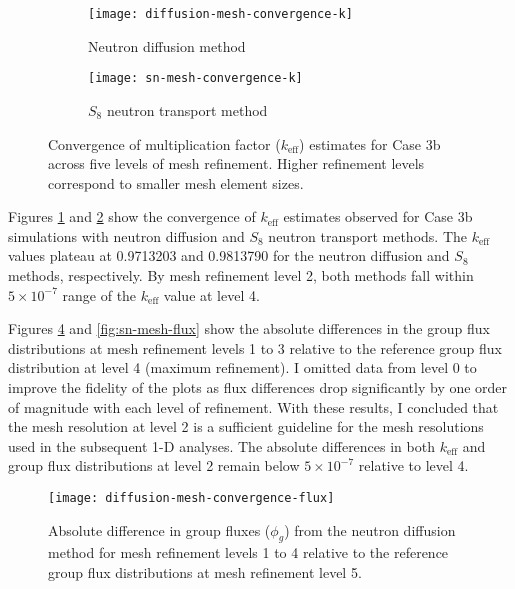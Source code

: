 \begin{figure}[htb!]
  \centering
  \begin{subfigure}[b]{0.48\columnwidth}
    \centering
    \texttt{[image: diffusion-mesh-convergence-k]}
    \caption{Neutron diffusion method}
    \label{fig:diff-mesh-k}
  \end{subfigure}
  \hfill
  \begin{subfigure}[b]{0.48\columnwidth}
    \centering
    \texttt{[image: sn-mesh-convergence-k]}
    \caption{$S_8$ neutron transport method}
    \label{fig:sn-mesh-k}
  \end{subfigure}
  \caption{Convergence of multiplication factor ($k_\text{eff}$) estimates for Case 3b across five
    levels of mesh refinement. Higher refinement levels correspond to smaller mesh element sizes.}
  \label{fig:mesh-k}
\end{figure}

Figures \ref{fig:diff-mesh-k} and \ref{fig:sn-mesh-k} show the convergence of $k_\text{eff}$
estimates observed for Case 3b simulations with neutron diffusion and $S_8$ neutron transport
methods. The $k_\text{eff}$ values plateau at 0.9713203 and 0.9813790 for the neutron diffusion and
$S_8$ methods, respectively. By mesh refinement level 2, both methods fall within $5\times 10^{-7}$
range of the $k_\text{eff}$ value at level 4.

Figures \ref{fig:diff-mesh-flux} and \ref{fig:sn-mesh-flux} show the absolute differences in the
group flux distributions at mesh refinement levels 1 to 3 relative to the reference group flux
distribution at level 4 (maximum refinement). I omitted data from level 0 to improve the fidelity
of the plots as flux differences drop significantly by one order of magnitude with each level of
refinement.
With these results, I concluded that the mesh resolution at level 2 is a sufficient guideline for
the mesh resolutions used in the subsequent 1-D analyses. The absolute differences in both
$k_\text{eff}$ and group flux distributions at level 2 remain below $5\times10^{-7}$ relative to
level 4.

\begin{figure}[htb!]
  \centering
  \texttt{[image: diffusion-mesh-convergence-flux]}
  \caption{Absolute difference in group fluxes ($\phi_g$) from the neutron diffusion method for
  mesh refinement levels 1 to 4 relative to the reference group flux distributions at mesh
  refinement level 5.}
  \label{fig:diff-mesh-flux}
\end{figure}

